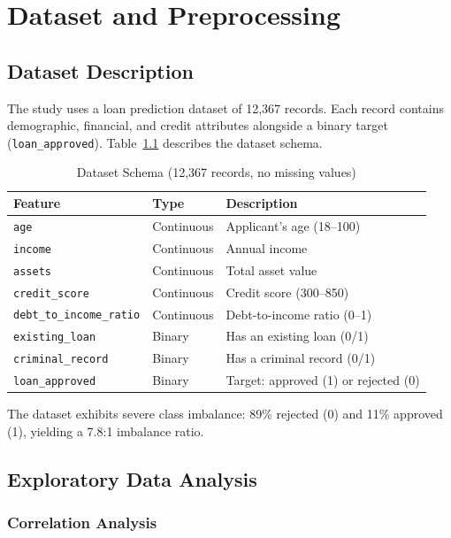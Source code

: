 \documentclass[12pt]{report}
\begin{document}
\chapter{Dataset and Preprocessing}

\section{Dataset Description}

The study uses a loan prediction dataset of 12,367 records. Each record contains demographic, financial, and credit attributes alongside a binary target (\texttt{loan\_approved}). Table~\ref{tab:schema} describes the dataset schema.

\begin{table}[H]
\centering
\caption{Dataset Schema (12,367 records, no missing values)}
\label{tab:schema}
\begin{tabular}{llp{6.5cm}}
\toprule
\textbf{Feature} & \textbf{Type} & \textbf{Description} \\
\midrule
\texttt{age} & Continuous & Applicant's age (18--100) \\
\texttt{income} & Continuous & Annual income \\
\texttt{assets} & Continuous & Total asset value \\
\texttt{credit\_score} & Continuous & Credit score (300--850) \\
\texttt{debt\_to\_income\_ratio} & Continuous & Debt-to-income ratio (0--1) \\
\texttt{existing\_loan} & Binary & Has an existing loan (0/1) \\
\texttt{criminal\_record} & Binary & Has a criminal record (0/1) \\
\texttt{loan\_approved} & Binary & Target: approved (1) or rejected (0) \\
\bottomrule
\end{tabular}
\end{table}

The dataset exhibits severe class imbalance: 89\% rejected (0) and 11\% approved (1), yielding a 7.8:1 imbalance ratio.

\section{Exploratory Data Analysis}

\subsection{Correlation Analysis}
\end{document}
